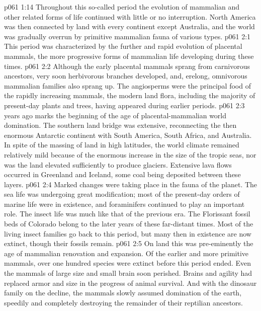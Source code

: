 \pc \vs p061 1:14 Throughout this so\hyp{}called  period the evolution of mammalian and other related forms of life continued with little or no interruption. North America was then connected by land with every continent except Australia, and the world was gradually overrun by primitive mammalian fauna of various types.
\vs p061 2:1 This period was characterized by the further and rapid evolution of placental mammals, the more progressive forms of mammalian life developing during these times.
\vs p061 2:2 Although the early placental mammals sprang from carnivorous ancestors, very soon herbivorous branches developed, and, erelong, omnivorous mammalian families also sprang up. The angiosperms were the principal food of the rapidly increasing mammals, the modern land flora, including the majority of present\hyp{}day plants and trees, having appeared during earlier periods.
\pc \vs p061 2:3  years ago marks the beginning of the age of placental\hyp{}mammalian world domination. The southern land bridge was extensive, reconnecting the then enormous Antarctic continent with South America, South Africa, and Australia. In spite of the massing of land in high latitudes, the world climate remained relatively mild because of the enormous increase in the size of the tropic seas, nor was the land elevated sufficiently to produce glaciers. Extensive lava flows occurred in Greenland and Iceland, some coal being deposited between these layers.
\vs p061 2:4 Marked changes were taking place in the fauna of the planet. The sea life was undergoing great modification; most of the present\hyp{}day orders of marine life were in existence, and foraminifers continued to play an important role. The insect life was much like that of the previous era. The Florissant fossil beds of Colorado belong to the later years of these far\hyp{}distant times. Most of the living insect families go back to this period, but many then in existence are now extinct, though their fossils remain.
\vs p061 2:5 On land this was pre\hyp{}eminently the age of mammalian renovation and expansion. Of the earlier and more primitive mammals, over one hundred species were extinct before this period ended. Even the mammals of large size and small brain soon perished. Brains and agility had replaced armor and size in the progress of animal survival. And with the dinosaur family on the decline, the mammals slowly assumed domination of the earth, speedily and completely destroying the remainder of their reptilian ancestors.\plusone
